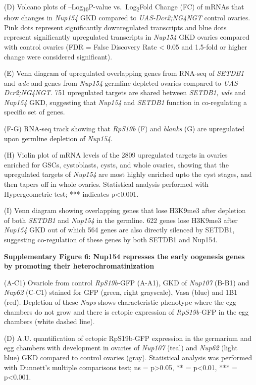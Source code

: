 \documentclass[12pt,oneside]{reedthesis}
\begin{document}
(D) Volcano plots of --Log\textsubscript{10}P-value vs.~Log\textsubscript{2}Fold Change (FC) of
mRNAs that show changes in \emph{Nup154} GKD compared to \emph{UAS-Dcr2;NG4NGT}
control ovaries. Pink dots represent significantly downregulated
transcripts and blue dots represent significantly upregulated
transcripts in \emph{Nup154} GKD ovaries compared with control ovaries (FDR =
False Discovery Rate \textless{} 0.05 and 1.5-fold or higher change were
considered significant).

(E) Venn diagram of upregulated overlapping genes from RNA-seq of
\emph{SETDB1} and \emph{wde} and genes from \emph{Nup154} germline depleted ovaries
compared to \emph{UAS-Dcr2;NG4NGT}. 751 upregulated targets are shared
between \emph{SETDB1, wde} and \emph{Nup154} GKD, suggesting that \emph{Nup154} and
\emph{SETDB1} function in co-regulating a specific set of genes.

(F-G) RNA-seq track showing that \emph{RpS19b} (F) and \emph{blanks} (G) are
upregulated upon germline depletion of \emph{Nup154}.

(H) Violin plot of mRNA levels of the 2809 upregulated targets in
ovaries enriched for GSCs, cystoblasts, cysts, and whole ovaries,
showing that the upregulated targets of \emph{Nup154} are most highly
enriched upto the cyst stages, and then tapers off in whole ovaries.
Statistical analysis performed with Hypergeometric test; ***
indicates p\textless0.001.

(I) Venn diagram showing overlapping genes that lose H3K9me3 after
depletion of both \emph{SETDB1} and \emph{Nup154} in the germline. 622 genes lose
H3K9me3 after \emph{Nup154} GKD out of which 564 genes are also directly
silenced by SETDB1, suggesting co-regulation of these genes by both
SETDB1 and Nup154.

\textbf{Supplementary Figure 6: Nup154 represses the early oogenesis genes by
promoting their heterochromatinization}

(A-C1) Ovariole from control \emph{RpS19b-}GFP (A-A1), GKD of \emph{Nup107} (B-B1)
and \emph{Nup62} (C-C1) stained for GFP (green, right grayscale), Vasa (blue)
and 1B1 (red). Depletion of these \emph{Nups} shows characteristic phenotype
where the egg chambers do not grow and there is ectopic expression of
\emph{RpS19b-}GFP in the egg chambers (white dashed line).

(D) A.U. quantification of ectopic RpS19b-GFP expression in the
germarium and egg chambers with development in ovaries of \emph{Nup107}
(teal) and \emph{Nup62} (light blue) GKD compared to control ovaries (gray).
Statistical analysis was performed with Dunnett's multiple comparisons
test; ns = p\textgreater0.05, ** = p\textless0.01, *** = p\textless0.001.
\end{document}
